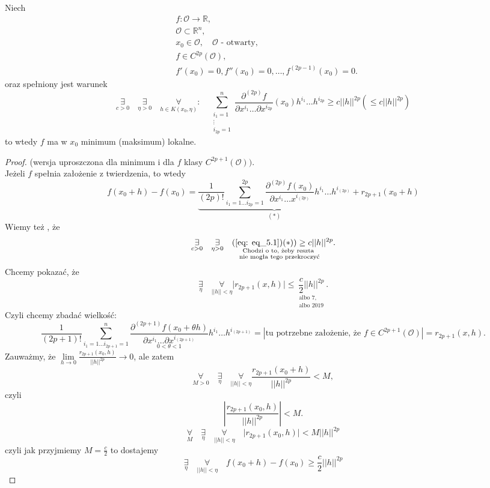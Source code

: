 \documentclass[../main.tex]{subfiles}
\begin{document}
\pagebreak
\begin{tw}
Niech
\begin{align*}
    &f: \mathcal{O} \to \mathbb{R},\\
    &\mathcal{O}\subset\mathbb{R}^n,\\
    &x_0\in\mathcal{O}, \quad \mathcal{O} \text{ - otwarty},\\
    &f \in C^{2p} (\mathcal{O}),\\
    &f'(x_0) = 0, f''(x_0) = 0,\dots,f^{(2p-1)} (x_0) = 0
.\end{align*}
oraz spełniony jest warunek
    \[
        \underset{c > 0}{\exists} \quad\underset{\eta > 0}{\exists} \quad\underset{h\in K(x_0,\eta)}{\forall}: \quad \sum_{\substack{i_1 = 1\\ \vdots \\ i_{2p} = 1}}^n \frac{\partial^{(2p)} f}{\partial x^{i_1} \dots \partial x^{i_{2p}}} (x_0) h^{i_1} \dots h^{i_{2p}} \geq c ||h||^{2p} (\leq c||h||^{2p})
    \]
to wtedy $f$ ma w $x_0$ minimum (maksimum) lokalne.
\end{tw}

\begin{proof}
(wersja uproszczona dla minimum i dla $f$ klasy $C^{2p+1}(\mathcal{O}))$.\\
Jeżeli $f$ spełnia założenie z twierdzenia, to wtedy
\begin{equation}
    \label{eq: eq_5.1}
    f(x_0+h)-f(x_0) = \underbrace{\frac{1}{(2p)!} \sum_{i_1 = 1\ldots i_{2p} = 1}^{2p} \frac{\partial^{(2p)} f(x_0)}{\partial x^{i_1} \dots x^{i_{(2p)}}} h^{i_1} \dots h^{i_{(2p)}}}_{(*)} + r_{2p + 1} (x_0 + h)
\end{equation}
Wiemy też , że
    \[
        \underset{c > 0}{\exists}\quad \underset{\eta > 0}{\exists} \underset{\substack{\text{Chodzi o to, żeby reszta}\\ \text{ nie mogła tego przekroczyć}}}{\quad(\ref{eq: eq_5.1})(*)) \geq c ||h||^{2p}}
    .\]
Chcemy pokazać, że
    \[
        \underset{\eta}{\exists} \quad \underset{||h||<\eta}{\forall} \Big | r_{2p+1} (x,h) \Big | \leq \underset{\substack{\text{albo 7,}\\ \text{albo 2019}}}{\frac{c}{2} ||h||^{2p}}
    .\]
Czyli chcemy zbadać wielkość:
    \[
        \frac{1}{(2p+1)!} \sum_{i_1 = 1 \ldots i_{2p+1} = 1}^n \underset{0 < \theta < 1}{\frac{\partial^{(2p+1)} f (x_0 + \theta h)}{\partial x^{i_1} \dots \partial x^{i_{(2p+1)}}}} h^{i_1} \dots h^{i_{(2p+1)}} = \left| \text{tu potrzebne założenie, że } f \in C^{2p+1} (\mathcal{O})\right| = r_{2p+1} (x,h)
    .\]
Zauważmy, że $\lim\limits_{h \to 0} \frac{r_{2p+1}(x_0, h)}{||h||^{2p}} \to 0$, ale zatem
    \[
        \underset{M>0}{\forall}\quad \underset{\eta}{\exists}\quad \underset{||h|| < \eta}{\forall} \frac{r_{2p+1}(x_0+h)}{||h||^{2p}} < M
    ,\]
czyli
\[
    \left| \frac{r_{2p+1} (x_0,h)}{||h||^{2p}} \right| < M.
\]
    \[
        \underset{M}{\forall}\quad \underset{\eta}{\exists}\quad \underset{||h|| < \eta}{\forall}\quad \Big | r_{2p+1} (x_0,h) \Big | < M \big | \big |h \big | \big |^{2p}
    \]
czyli jak przyjmiemy $M = \frac{c}{2}$ to dostajemy
    \[
        \underset{\eta}{\exists}\quad \underset{||h||<\eta}{\forall}\quad f(x_0+h)-f(x_0) \geq \frac{c}{2} ||h||^{2p}
    \]
\end{proof}
\end{document}
